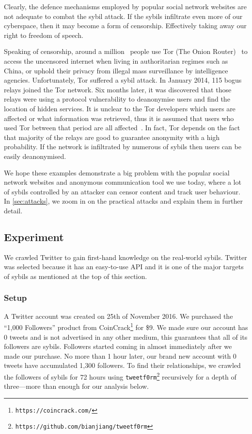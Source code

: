 Clearly, the defence mechanisms employed by popular social network websites are
not adequate to combat the sybil attack. If the sybils infiltrate even more of
our cyberspace, then it may become a form of censorship. Effectively taking away
our right to freedom of speech.

Speaking of censorship, around a million~\cite{tormetric} people use Tor (The
Onion Router)~\cite{dingledine2004tor} to access the uncensored internet when
living in authoritarian regimes such as China, or uphold their privacy from
illegal mass surveillance by intelligence agencies. Unfortunately, Tor suffered
a sybil attack. In January 2014, 115 bogus relays joined the Tor network. Six months
later, it was discovered that those relays were using a protocol vulnerability
to deanonymise users and find the location of hidden services. It is unclear to
the Tor developers which users are affected or what information was retrieved,
thus it is assumed that users who used Tor between that period are all
affected~\cite{torsybil}. In fact, Tor depends on the fact that majority of the
relays are good to guarantee anonymity with a high probability. If the network
is infiltrated by numerous of sybils then users can be easily
deanonymised.

We hope these examples demonstrate a big problem with the popular social network
websites and anonymous communication tool we use today, where a lot of sybils
controlled by an attacker can censor content and track user behaviour. In
\autoref{sec:attacks}, we zoom in on the practical attacks and explain them in
further detail.

\subsection{Experiment}
We crawled Twitter to gain first-hand knowledge on the real-world sybils.
Twitter was selected because it has an easy-to-use API and it is one of the
major targets of sybils as mentioned at the top of this section.

\subsubsection{Setup}
A Twitter account was created on 25th of November 2016. We purchased the ``1,000
Followers'' product from CoinCrack\footnote{\texttt{https://coincrack.com/}} for
\$9. We made sure our account has 0 tweets and is not advertised in any other
medium, this guarantees that all of its followers are sybils. Followers started
coming in almost immediately after we made our purchase. No more than 1 hour
later, our brand new account with 0 tweets have accumulated 1,300 followers. To
find their relationships, we crawled the followers of sybils for 72 hours using
\verb!tweetf0rm!\footnote{\texttt{https://github.com/bianjiang/tweetf0rm}}
recursively for a depth of three---more than enough for our analysis below.

